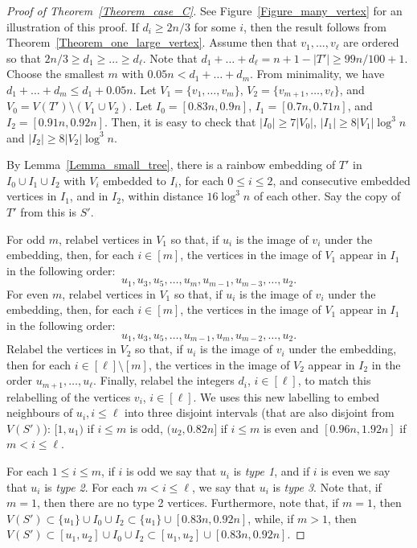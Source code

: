 \documentclass{article}
\theoremstyle{definition}
\begin{document}
\begin{proof}[Proof of Theorem~\ref{Theorem_case_C}]
See Figure~\ref{Figure_many_vertex} for an illustration of this proof. If $d_i\geq 2n/3$ for some $i$, then the result follows from Theorem~\ref{Theorem_one_large_vertex}.
Assume then that $v_1, \dots, v_{\ell}$ are ordered so that $2n/3\geq d_1\geq \dots\geq d_{\ell}$. Note that $d_1+\dots+d_{\ell}= n+1-|T'|\geq 99n/100+1$. Choose the smallest $m$ with $0.05n< d_1+ \dots+ d_m$. From minimality, we have $d_1+\dots+ d_m\leq d_1+0.05n$. Let $V_1=\{v_1, \dots ,v_m\}$, $V_2=\{v_{m+1}, \dots, v_{\ell}\}$, and $V_0=V(T')\setminus (V_1\cup V_2)$.
Let $I_0=[0.83n, 0.9n]$, $I_1=[0.7n, 0.71n]$, and $I_2=[0.91n, 0.92n]$. Then, it is easy to check that $|I_0| \geq 7|V_0|$, $|I_1|\geq 8|V_1|\log^3 n$ and $|I_2|\geq 8|V_2|\log^3 n$.

By Lemma~\ref{Lemma_small_tree}, there is a rainbow embedding of $T'$ in $I_0\cup I_1\cup I_2$ with $V_i$ embedded to $I_i$, for each $0 \leq i\leq 2$, and consecutive embedded vertices in $I_1$, and in $I_2$, within distance $16\log^3 n$ of each other. Say the copy of $T'$ from this is $S'$.

For odd  $m$, relabel vertices in $V_1$ so that, if $u_i$ is the image of $v_i$ under the embedding, then, for each $i\in [m]$, the vertices in the image of $V_1$ appear in $I_1$ in the following order:
\[
u_1,u_3,u_5,\ldots,u_{m},u_{m-1},u_{m-3},\ldots,u_2.
\]
For even $m$, relabel vertices in $V_1$ so that, if $u_i$ is the image of $v_i$ under the embedding, then, for each $i\in [m]$, the vertices in the image of $V_1$ appear in $I_1$ in the following order:
\[
u_1,u_3,u_5,\ldots,u_{m-1},u_{m},u_{m-2},\ldots,u_2.
\]
Relabel the vertices in $V_2$ so that, if $u_i$ is the image of $v_i$ under the embedding, then for each $i\in [\ell]\setminus [m]$, the vertices in the image of $V_2$ appear in $I_2$ in the order $u_{m+1},\ldots,u_\ell$. Finally, relabel the integers $d_i$, $i\in [\ell]$, to match this relabelling of the vertices $v_i$, $i\in [\ell]$. We uses this new labelling to embed neighbours of $u_i, i \leq \ell$ into three disjoint intervals (that are also disjoint from $V(S')$): $[1,u_1)$ if $i\leq m$ is odd, $(u_2,0.82n]$ if $i\leq m$ is even and $[0.96n,1.92n]$ if $m < i \leq \ell$.

For each $1\leq i\leq m$, if $i$ is odd we say that $u_i$ is \emph{type 1}, and if $i$ is even we say that $u_i$ is \emph{type 2}. For each $m<i\leq \ell$, we say that $u_i$ is \emph{type 3}. Note that, if $m=1$, then there are no type 2 vertices.
Furthermore, note that, if $m=1$, then $V(S')\subset \{u_1\}\cup I_0\cup I_2\subset \{u_1\}\cup [0.83n,0.92n]$, while, if $m>1$, then $V(S')\subset [u_1,u_2]\cup I_0\cup I_2\subset [u_1,u_2]\cup [0.83n,0.92n]$.


\end{proof}
\end{document}

